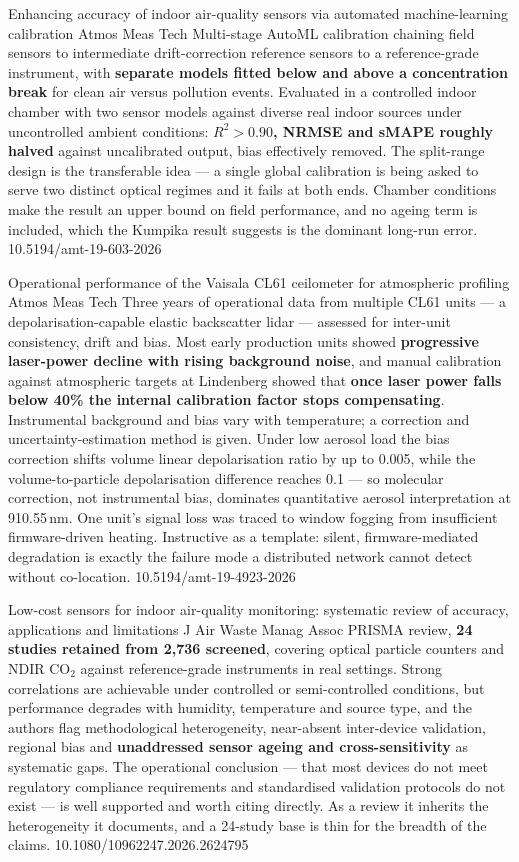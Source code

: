 \documentclass[10pt]{article}
\begin{document}
{Enhancing accuracy of indoor air-quality sensors via automated machine-learning
calibration}
{Atmos Meas Tech}
{Multi-stage AutoML calibration chaining field sensors to intermediate drift-correction
reference sensors to a reference-grade instrument, with \textbf{separate models fitted
below and above a concentration break} for clean air versus pollution events. Evaluated
in a controlled indoor chamber with two sensor models against diverse real indoor sources
under uncontrolled ambient conditions: \textbf{$R^2 > 0.90$, NRMSE and sMAPE roughly
halved} against uncalibrated output, bias effectively removed. The split-range design is
the transferable idea --- a single global calibration is being asked to serve two distinct
optical regimes and it fails at both ends. Chamber conditions make the result an upper
bound on field performance, and no ageing term is included, which the Kumpika result
suggests is the dominant long-run error.}
{10.5194/amt-19-603-2026}

{Operational performance of the Vaisala CL61 ceilometer for atmospheric profiling}
{Atmos Meas Tech}
{Three years of operational data from multiple CL61 units --- a depolarisation-capable
elastic backscatter lidar --- assessed for inter-unit consistency, drift and bias. Most
early production units showed \textbf{progressive laser-power decline with rising
background noise}, and manual calibration against atmospheric targets at Lindenberg
showed that \textbf{once laser power falls below 40\% the internal calibration factor
stops compensating}. Instrumental background and bias vary with temperature; a correction
and uncertainty-estimation method is given. Under low aerosol load the bias correction
shifts volume linear depolarisation ratio by up to 0.005, while the volume-to-particle
depolarisation difference reaches 0.1 --- so molecular correction, not instrumental bias,
dominates quantitative aerosol interpretation at 910.55\,nm. One unit's signal loss was
traced to window fogging from insufficient firmware-driven heating. Instructive as a
template: silent, firmware-mediated degradation is exactly the failure mode a distributed
network cannot detect without co-location.}
{10.5194/amt-19-4923-2026}

{Low-cost sensors for indoor air-quality monitoring: systematic review of accuracy,
applications and limitations}
{J Air Waste Manag Assoc}
{PRISMA review, \textbf{24 studies retained from 2{,}736 screened}, covering optical
particle counters and NDIR CO$_2$ against reference-grade instruments in real settings.
Strong correlations are achievable under controlled or semi-controlled conditions, but
performance degrades with humidity, temperature and source type, and the authors flag
methodological heterogeneity, near-absent inter-device validation, regional bias and
\textbf{unaddressed sensor ageing and cross-sensitivity} as systematic gaps. The
operational conclusion --- that most devices do not meet regulatory compliance
requirements and standardised validation protocols do not exist --- is well supported and
worth citing directly. As a review it inherits the heterogeneity it documents, and a
24-study base is thin for the breadth of the claims.}
{10.1080/10962247.2026.2624795}
\end{document}
